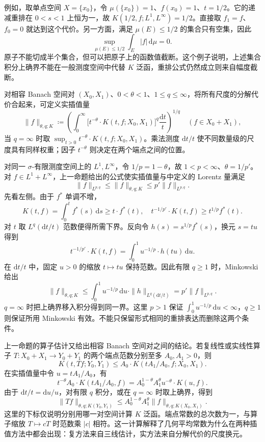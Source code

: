 例如，取单点空间 \(X=\{x_0\}\)，令 \(\mu(\{x_0\})=1\)、\(f(x_0)=1\)、\(t=1/2\)。它的递减重排在 \(0<s<1\) 上恒为一，故 \(K(1/2,f;L^1,L^\infty)=1/2\)。直接取 \(f_1=f\)、\(f_0=0\) 就达到这个代价。另一方面，满足 \(\mu(E)\leq1/2\) 的集合只有空集，因此
\[
 \sup_{\mu(E)\leq1/2}\int_E|f|\,\mathrm d\mu=0.
\]
原子不能切成半个集合，但可以把原子上的函数值截断。这个例子说明，上述集合积分上确界不能在一般测度空间中代替 \(K\) 泛函，重排公式仍然成立则来自幅度截断。

\ProseParagraphBreak

对相容 Banach 空间对 \((X_0,X_1)\)、\(0<\theta<1\)、\(1\leq q\leq\infty\)，将所有尺度的分解代价合起来，可定义实插值量
\[
 \|f\|_{\theta,q;K}\coloneqq
 \left(\int_0^\infty
 \bigl[t^{-\theta}\cdot K(t,f;X_0,X_1)\bigr]^q
 \frac{\mathrm dt}{t}\right)^{1/q}
 \quad(f\in X_0+X_1),
\]
当 \(q=\infty\) 时取 \(\sup_{t>0}t^{-\theta}\cdot K(t,f;X_0,X_1)\)。乘法测度 \(\mathrm dt/t\) 使不同数量级的尺度具有同样权重；因子 \(t^{-\theta}\) 则决定在两个端点之间的位置。

\ProseParagraphBreak

对同一 \(\sigma\)-有限测度空间上的 \(L^1,L^\infty\)，令 \(1/p=1-\theta\)，故 \(1<p<\infty\)、\(\theta=1/p'\)。对 \(f\in L^1+L^\infty\)，上一命题给出的公式使实插值量与中定义的 Lorentz 量满足
\[
 \|f\|_{L^{p,q}}\leq\|f\|_{\theta,q;K}
 \leq p'\|f\|_{L^{p,q}}.
\]
先看左侧。由于 \(f^*\) 单调不增，
\[
 K(t,f)=\int_0^t f^*(s)\,\mathrm ds
 \geq t\cdot f^*(t),
 \quad t^{-1/p'}\cdot K(t,f)\geq t^{1/p}f^*(t).
\]
对 \(t\) 取 \(L^q(\mathrm dt/t)\) 范数便得所需下界。反向令 \(h(s)=s^{1/p}f^*(s)\)，换元 \(s=tu\) 得到
\[
 t^{-1/p'}\cdot K(t,f)
 =\int_0^1u^{-1/p}\cdot h(tu)\,\mathrm du.
\]
在 \(\mathrm dt/t\) 中，固定 \(u>0\) 的缩放 \(t\mapsto tu\) 保持范数。因此有限 \(q\geq1\) 时，Minkowski 给出
\[
 \|f\|_{\theta,q;K}
 \leq\int_0^1u^{-1/p}\,\mathrm du\cdot
 \|h\|_{L^q(\mathrm dt/t)}
 =p'\|f\|_{L^{p,q}}.
\]
\(q=\infty\) 时把上确界移入积分得到同一界。这里 \(p>1\) 保证 \(\int_0^1u^{-1/p}\,\mathrm du<\infty\)，\(q\geq1\) 则保证所用 Minkowski 有效。不能只保留形式相同的重排表达而删除这两个条件。

\ProseParagraphBreak

上一命题的算子估计又给出相容 Banach 空间对之间的结论。若复线性或实线性算子 \(T:X_0+X_1\rightarrow Y_0+Y_1\) 的两个端点范数分别至多 \(A_0,A_1>0\)，则
\[
 K(t,Tf;Y_0,Y_1)
 \leq A_0\cdot K(tA_1/A_0,f;X_0,X_1).
\]
在实插值量中令 \(u=tA_1/A_0\)，有
\[
 t^{-\theta}A_0\cdot K(tA_1/A_0,f)
 =A_0^{1-\theta}A_1^\theta u^{-\theta}\cdot K(u,f).
\]
由于 \(\mathrm dt/t=\mathrm du/u\)，对有限 \(q\) 积分，或在 \(q=\infty\) 时取上确界，得到
\[
 \|Tf\|_{\theta,q;K(Y_0,Y_1)}
 \leq A_0^{1-\theta}A_1^\theta
 \|f\|_{\theta,q;K(X_0,X_1)}.
\]
这里的下标仅说明分别用哪一对空间计算 \(K\) 泛函。端点常数的总次数为一，与算子缩放 \(T\mapsto cT\) 时范数乘 \(|c|\) 相符。这一计算解释了几何平均常数为什么在两种插值方法中都会出现：复方法来自三线估计，实方法来自分解代价的尺度换元。

